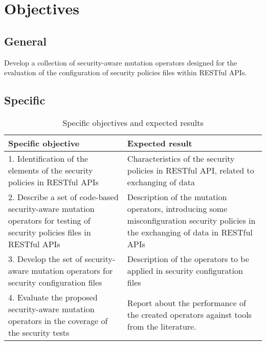 \section{Objectives}

\subsection{General}

Develop a collection of security-aware mutation operators designed for the evaluation of the configuration of security policies files within RESTful APIs.
\subsection{Specific}

\begin{table}[H]
    \centering
    \begin{tabular}{|p{}|p{}|}
        \hline
         \textbf{Specific objective} & \textbf{Expected result} \\ \hline
         1.  Identification of the elements of the security policies in RESTful APIs  &  Characteristics of the security policies in RESTful API, related to exchanging of data   \\  \hline
         2. Describe a set of code-based security-aware mutation operators for testing of security policies   files in RESTful APIs  & Description of the mutation operators, introducing some misconfiguration security policies in the exchanging of data in RESTful APIs\\  \hline
         3. Develop the set of security-aware mutation operators for security configuration files  & Description of the operators to be applied in security configuration files \\  \hline
         4. Evaluate the proposed security-aware mutation operators in the coverage of the security tests  & Report about the performance of the created operators against tools from the literature.
         \\ \hline
    \end{tabular}
    \caption{Specific objectives and expected results}
    \label{tab:objetivos}
\end{table}
